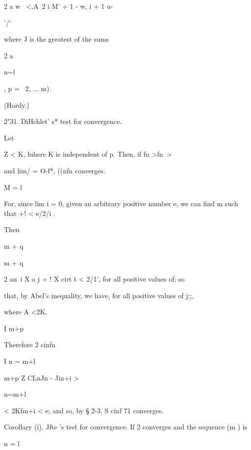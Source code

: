 2 a w \ <,A\ 2 i M' + 1 - w, i + 1 u-



'/'



where J is the greatest of the sums



2 a

n=l



, p = \, 2, ... m).



(Hardy.)



2"31. DiHchlet' s* test for convergence.



Let



Z < K, luhere K is independent of p. Then, if fn >fn\-\ >



and lim/ = O-f*, ((nfn converges.

M = l

For, since lim i = 0, given an arbitrary positive number e, we can
find m such that +! < e/2/i .



Then



m + q



m + q



2 an\ i X a j + ! X cirt t < 2/1', for all positive values of; so



that, by Abel's inequality, we have, for all positive values of j;;,



where A <2K.

I m+p

Therefore 2 cinfn

I n = m+l



m+p Z CLnJn - Jin+i >



n=m+l



< 2Kfm+i < e; and so, by § 2-3, S cinf 71 converges.



Corollary (i). Jfte 's test for convergence. If 2 converges and the
sequence (m ) is

n = l

